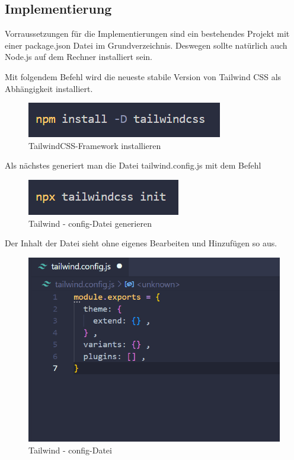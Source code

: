 \subsection*{Implementierung}
Vorraussetzungen für die Implementierungen sind ein bestehendes Projekt 
mit einer package.json Datei im Grundverzeichnis. Deswegen sollte natürlich auch Node.js 
auf dem Rechner installiert sein. 
\newpage

Mit folgendem Befehl wird die neueste stabile 
Version von Tailwind CSS als Abhängigkeit installiert. 
\begin{figure}[ht!]
  \centering
  \includegraphics[scale=1.2]{pics/install-tailwind.PNG}
  \caption{\label{fig:Tailwind}TailwindCSS-Framework installieren }
\end{figure}

Als nächstes generiert man die Datei tailwind.config.js mit dem Befehl
\begin{figure}[ht!]
  \centering
  \includegraphics[scale=1.2]{pics/create-tailwind-config.PNG}
  \caption{\label{fig:Tailwind}Tailwind - config-Datei generieren }
\end{figure}

Der Inhalt der Datei sieht ohne eigenes Bearbeiten und Hinzufügen so aus. 
\begin{figure}[ht!]
  \includegraphics[scale=1.2]{pics/tailwind-config.PNG}
  \caption{\label{fig:Tailwind}Tailwind - config-Datei }
\end{figure}

